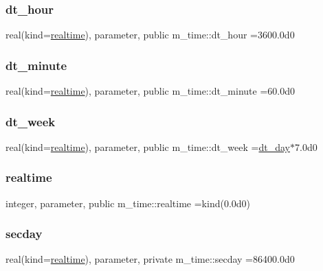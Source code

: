 \subsubsection{\texorpdfstring{dt\+\_\+hour}{dt\_hour}}
{\footnotesize\ttfamily real(kind=\mbox{\hyperlink{namespacem__time_ac10ea9e8d59ec74eaa7d89f2517d7422}{realtime}}), parameter, public m\+\_\+time\+::dt\+\_\+hour =3600.\+0d0}

\mbox{\label{namespacem__time_a9fe6fbb44e2779a2fcf96fba36c08918}} 
\subsubsection{\texorpdfstring{dt\+\_\+minute}{dt\_minute}}
{\footnotesize\ttfamily real(kind=\mbox{\hyperlink{namespacem__time_ac10ea9e8d59ec74eaa7d89f2517d7422}{realtime}}), parameter, public m\+\_\+time\+::dt\+\_\+minute =60.\+0d0}

\mbox{\label{namespacem__time_a3d53519e90264faccdae67e389ffc003}} 
\subsubsection{\texorpdfstring{dt\+\_\+week}{dt\_week}}
{\footnotesize\ttfamily real(kind=\mbox{\hyperlink{namespacem__time_ac10ea9e8d59ec74eaa7d89f2517d7422}{realtime}}), parameter, public m\+\_\+time\+::dt\+\_\+week =\mbox{\hyperlink{namespacem__time_a97725f8d657c24badff19a794f323a6b}{dt\+\_\+day}}$\ast$7.\+0d0}

\mbox{\label{namespacem__time_ac10ea9e8d59ec74eaa7d89f2517d7422}} 
\subsubsection{\texorpdfstring{realtime}{realtime}}
{\footnotesize\ttfamily integer, parameter, public m\+\_\+time\+::realtime =kind(0.\+0d0)}

\mbox{\label{namespacem__time_a48130b5a95a3f2e776269dcee1426797}} 
\subsubsection{\texorpdfstring{secday}{secday}}
{\footnotesize\ttfamily real(kind=\mbox{\hyperlink{namespacem__time_ac10ea9e8d59ec74eaa7d89f2517d7422}{realtime}}), parameter, private m\+\_\+time\+::secday =86400.\+0d0\hspace{0.3cm}{\ttfamily [private]}}

